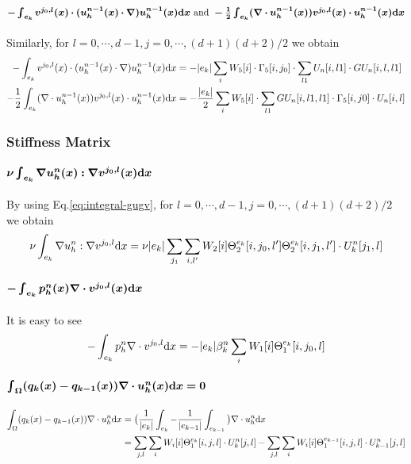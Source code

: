 \paragraph{$\bm{-\int_{e_k}v^{j_0,l}(x)\cdot(u_h^{n-1}(x)\cdot\nabla)
u_h^{n-1}(x)\mathrm{d} x
\text{ and }-\frac{1}{2}\int_{e_k}(\nabla\cdot u_h^{n-1}(x))v^{j_0,l}(x)
\cdot u_h^{n-1}(x)\mathrm{d} x}$}
Similarly, for $l=0,\cdots,d-1,j=0,\cdots,(d+1)(d+2)/2$ we obtain
\begin{equation}
  \begin{split}
    -\int_{e_k} v^{j_0,l}(x)\cdot(u_h^{n-1}(x)\cdot\nabla)u_h^{n-1}(x)\mathrm{d} x
    &= -|e_k|\sum_iW_5[i]\cdot\Gamma_5[i,j_0]\cdot
    \sum_{l1}U_n[i,l1]\cdot GU_n[i,l,l1] \\
    -\frac12\int_{e_k}(\nabla\cdot u_h^{n-1}(x))v^{j_0,l}(x)\cdot u_h^{n-1}(x)\mathrm{d} x
    &= -\frac{|e_k|}2\sum_iW_5[i]\cdot\sum_{l1}GU_n[i,l1,l1]
    \cdot \Gamma_5[i,j0] \cdot U_n[i,l]
  \end{split}
\end{equation}

\subsubsection{Stiffness Matrix}
\paragraph{$\bm{\nu\int_{e_k}\nabla u_h^n(x):\nabla v^{j_0,l}(x)\mathrm{d} x}$} 
By using Eq.\eqref{eq:integral-gugv}, 
for $l=0,\cdots,d-1,j=0,\cdots,(d+1)(d+2)/2$ we obtain
\begin{equation}
    \nu\int_{e_k} \nabla u_h^n:\nabla v^{j_0,l}\mathrm{d} x = \nu|e_k| \sum_{j_1} 
    \sum_{i,l'}W_2[i]\Theta_2^{e_k}[i,j_0,l']\Theta_2^{e_k}[i,j_1,l'] 
    \cdot U^n_k[j_1,l]
\end{equation}

\paragraph{$\bm{-\int_{e_k}p_h^n(x)\nabla\cdot v^{j_0,l}(x)\mathrm{d} x}$}
It is easy to see
\begin{equation}
    -\int_{e_k} p_h^n\nabla\cdot v^{j_0,l}\mathrm{d} x
    = -|e_k| \beta^n_k\sum_i W_1[i] \Theta_1^{e_k}[i,j_0,l]
\end{equation}

\paragraph{$\bm{\int_{\Omega}(q_k(x)-q_{k-1}(x))\nabla\cdot u_h^n(x)\mathrm{d} x=0}$}
\begin{equation}
  \begin{split}
    \int_\Omega(q_k(x)-q_{k-1}(x))\nabla\cdot u_h^n\mathrm{d} x &=
    \big(\frac1{|e_k|}\int_{e_k}-\frac1{|e_{k-1}|}\int_{e_{k-1}}\big)
    \nabla \cdot u_h^n\mathrm{d} x \\
    &= \sum_{j,l}\sum_{i} W_i[i]\Theta_1^{e_k}[i,j,l]\cdot U_k^n[j,l] 
    -\sum_{j,l}\sum_{i} W_i[i]\Theta_1^{e_{k-1}}[i,j,l]\cdot U_{k-1}^n[j,l]
  \end{split}
\end{equation}

